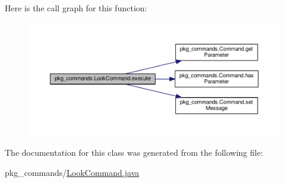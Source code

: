 Here is the call graph for this function\-:
\nopagebreak
\begin{figure}[H]
\begin{center}
\leavevmode
\includegraphics[width=350pt]{classpkg__commands_1_1LookCommand_af336146fae1e14bf434d85a5acbcdcd7_cgraph}
\end{center}
\end{figure}




The documentation for this class was generated from the following file\-:\begin{DoxyCompactItemize}
\item 
pkg\-\_\-commands/\hyperlink{LookCommand_8java}{Look\-Command.\-java}\end{DoxyCompactItemize}
